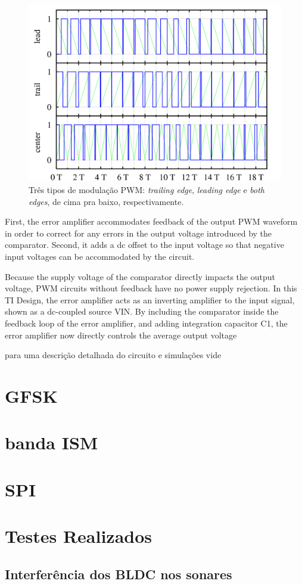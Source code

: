   \begin{figure}[!htb] %
    \centering
    \includegraphics[width=0.7\linewidth]{../../Imagens/PWM_modulation_types.png}
    \caption{Três tipos de modulação PWM: \textit{trailing edge}, \textit{leading edge} e  \textit{both edges}, de cima pra baixo, respectivamente.}
    \label{pwm_modulation_types}
  \end{figure}
  
   First, the error amplifier accommodates feedback of the output PWM waveform in order to correct for any errors in the
output voltage introduced by the comparator. Second, it adds a dc offset to the input voltage so that negative input voltages can be accommodated by 
the circuit.
 
 Because the supply voltage of the comparator directly impacts the output voltage, PWM circuits without feedback have no power supply rejection. In 
this TI Design, the error amplifier acts as an inverting amplifier to the input signal, shown as a dc-coupled source VIN. By including the comparator 
inside the feedback loop of the error amplifier, and adding integration capacitor C1, the error amplifier now directly controls the average output 
voltage



para uma descrição detalhada do circuito e simulações vide \cite{pwm_modulator}

\section{GFSK}

\section{banda ISM}

\section{SPI}

\section{Testes Realizados}
\subsection{Interferência dos BLDC nos sonares}

